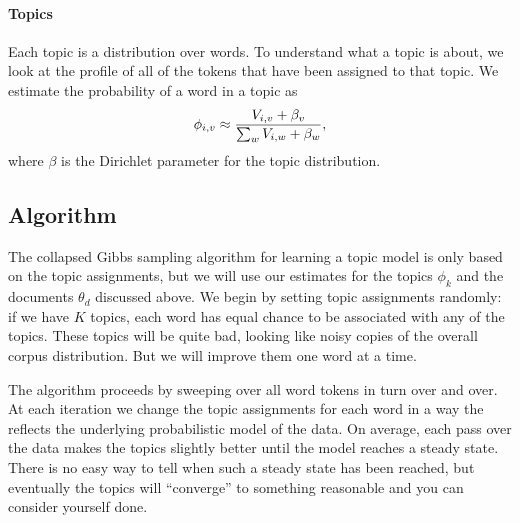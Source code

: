 \paragraph{Topics}

Each topic is a distribution over words.  To understand what a topic is about,
we look at the profile of all of the tokens that have been assigned to that
topic.  We estimate the probability of a word in a topic as
\begin{equation}
\phi_{i,v} \approx \frac{V_{i,v} + \beta_v}{\sum_w V_{i,w} + \beta_w},
\label{eq:phi_map}
\end{equation}
where $\beta$ is the Dirichlet parameter for the topic distribution.

\subsection{Algorithm}

The collapsed Gibbs sampling algorithm for learning a topic model is
only based on the topic assignments, but we will use our estimates for
the topics $\phi_k$ and the documents $\theta_d$ discussed above.  We
begin by setting topic assignments randomly: if we have $K$ topics,
each word has equal chance to be associated with any of the topics.
These topics will be quite bad, looking like noisy copies of the
overall corpus distribution. But we will improve them one word at a
time.

The algorithm proceeds by sweeping over all word tokens in turn over and over.
At each iteration we change the topic assignments for each word in a way the reflects the
underlying probabilistic model of the data.  On average, each pass over the data makes the
topics slightly better until the model reaches a steady state.  There is no easy way
to tell when such a steady state has been reached, but eventually the topics will ``converge'' to something reasonable and you can consider yourself done.

